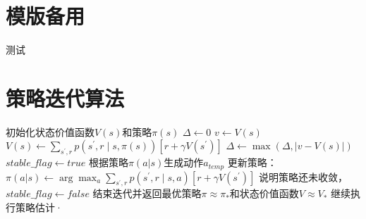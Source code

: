 \documentclass[11pt]{ctexart}
\begin{document}
\tableofcontents %
\clearpage
\section{模版备用}
\begin{algorithm}[H] %
	\renewcommand{\thealgorithm}{} %
	\caption{} 
	\begin{algorithmic}[1] %
		\STATE 测试
	\end{algorithmic}
\end{algorithm}
\clearpage
\section{策略迭代算法}
\begin{algorithm}[H] %
	\renewcommand{\thealgorithm}{} %
	\caption{} 
	\begin{algorithmic}[1] %
		\STATE 初始化状态价值函数$V(s)$和策略$\pi(s)$
		\REPEAT
			\STATE $\Delta \leftarrow 0$
			\REPEAT
				\STATE $v \leftarrow V(s)$
				\STATE $V(s) \leftarrow \sum_{s^{\prime}, r} p\left(s^{\prime}, r \mid s, \pi(s)\right)\left[r+\gamma V\left(s^{\prime}\right)\right]$
				\STATE $\Delta \leftarrow \max (\Delta,|v-V(s)|)$
		\UNTIL{$\Delta < \theta$}
		\STATE $stable\_flag \leftarrow true$
		\REPEAT
			\STATE 根据策略$\pi(a|s)$生成动作$a_{temp}$
			\STATE 更新策略：$\pi(a|s) \leftarrow \arg \max _a \sum_{s^{\prime}, r} p\left(s^{\prime}, r \mid s, a\right)\left[r+\gamma V\left(s^{\prime}\right)\right]$
				\STATE 说明策略还未收敛，$stable\_flag \leftarrow false$
			\ENDIF
			\STATE 结束迭代并返回最优策略$\pi \approx \pi_*$和状态价值函数$V \approx V_*$
		\ELSE
			\STATE 继续执行策略估计·
		\ENDIF

	\end{algorithmic}
\end{algorithm}
\clearpage
\end{document}
